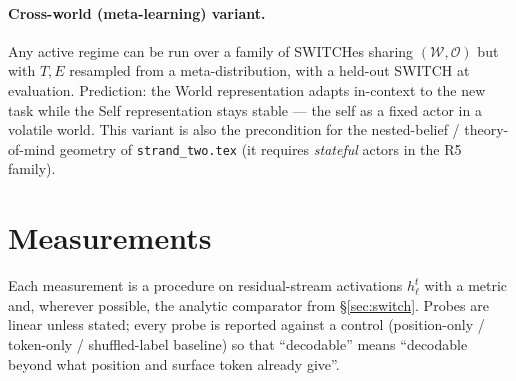 \documentclass[11pt]{article}
\begin{document}
\paragraph{Cross-world (meta-learning) variant.}
\label{sec:metalearn}
Any active regime can be run over a family of SWITCHes sharing
$(\mathcal{W},\mathcal{O})$ but with $T,E$ resampled from a meta-distribution,
with a held-out SWITCH at evaluation. Prediction: the World representation
adapts in-context to the new task while the Self representation stays stable ---
the self as a fixed actor in a volatile world. This variant is also the
precondition for the nested-belief / theory-of-mind geometry of
\texttt{strand\_two.tex} (it requires \emph{stateful} actors in the R5 family).

\section{Measurements}
\label{sec:measure}

Each measurement is a procedure on residual-stream activations $h_\ell^t$ with a
metric and, wherever possible, the analytic comparator from \S\ref{sec:switch}.
Probes are linear unless stated; every probe is reported against a control
(position-only / token-only / shuffled-label baseline) so that ``decodable''
means ``decodable beyond what position and surface token already give''.
\end{document}
